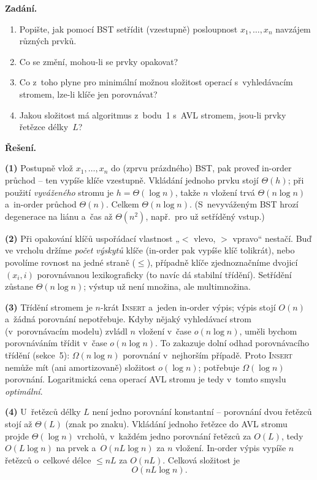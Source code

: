 \documentclass[11pt,a4paper]{article}
\begin{document}
\begin{priklad}
\par
\textbf{Zadání.}
\begin{enumerate}
  \item Popište, jak pomocí BST setřídit (vzestupně) posloupnost $x_1,\dots,x_n$ navzájem různých prvků.
  \item Co se změní, mohou-li se prvky opakovat?
  \item Co z~toho plyne pro minimální možnou složitost operací s~vyhledávacím stromem, lze-li klíče jen porovnávat?
  \item Jakou složitost má algoritmus z~bodu~1 s~AVL stromem, jsou-li prvky řetězce délky~$L$?
\end{enumerate}

\smallskip
\textbf{Řešení.}\par
\textbf{(1)} Postupně vlož $x_1,\dots,x_n$ do (zprvu prázdného) BST, pak proveď in-order průchod -- ten vypíše klíče vzestupně. Vkládání jednoho prvku stojí $\Theta(h)$; při použití \emph{vyváženého} stromu je $h=\Theta(\log n)$, takže $n$ vložení trvá $\Theta(n\log n)$ a~in-order průchod $\Theta(n)$. Celkem $\boxed{\Theta(n\log n)}$. (S~nevyváženým BST hrozí degenerace na liánu a~čas až $\Theta(n^2)$, např.\ pro už setříděný vstup.)

\textbf{(2)} Při opakování klíčů uspořádací vlastnost „$<$ vlevo, $>$ vpravo`` nestačí. Buď ve vrcholu držíme \emph{počet výskytů} klíče (in-order pak vypíše klíč tolikrát), nebo povolíme rovnost na jedné straně ($\le$), případně klíče zjednoznačníme dvojicí $(x_i,i)$ porovnávanou lexikograficky (to navíc dá stabilní třídění). Setřídění zůstane $\Theta(n\log n)$; výstup už není množina, ale multimnožina.

\textbf{(3)} Třídění stromem je $n$-krát \textsc{Insert} a~jeden in-order výpis; výpis stojí $O(n)$ a~žádná porovnání nepotřebuje. Kdyby nějaký vyhledávací strom (v~porovnávacím modelu) zvládl $n$ vložení v~čase $o(n\log n)$, uměli bychom porovnáváním třídit v~čase $o(n\log n)$. To zakazuje dolní odhad porovnávacího třídění (sekce~5): $\Omega(n\log n)$ porovnání v~nejhorším případě. Proto \textsc{Insert} nemůže mít (ani amortizovaně) složitost $o(\log n)$; potřebuje $\Omega(\log n)$ porovnání. Logaritmická cena operací AVL stromu je tedy v~tomto smyslu \emph{optimální}.

\textbf{(4)} U~řetězců délky $L$ není jedno porovnání konstantní -- porovnání dvou řetězců stojí až $\Theta(L)$ (znak po znaku). Vkládání jednoho řetězce do AVL stromu projde $\Theta(\log n)$ vrcholů, v~každém jedno porovnání řetězců za $O(L)$, tedy $O(L\log n)$ na prvek a~$O(nL\log n)$ za $n$ vložení. In-order výpis vypíše $n$ řetězců o~celkové délce $\le nL$ za $O(nL)$. Celková složitost je
\[
\boxed{O(nL\log n)} .
\]
\end{priklad}
\end{document}
